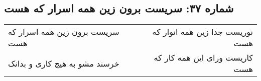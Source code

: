 \begin{center}
\section*{شماره ۳۷: سریست برون زین همه اسرار که هست}
\label{sec:037}
\begin{longtable}{l p{0.5cm} r}
سریست برون زین همه اسرار که هست
&&
نوریست جدا زین همه انوار که هست
\\
خرسند مشو به هیچ کاری و بدانک
&&
کاریست ورای این همه کار که هست
\\
\end{longtable}
\end{center}
